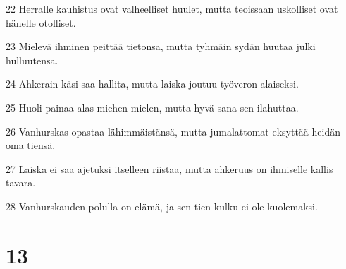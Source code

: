 \par 22 Herralle kauhistus ovat valheelliset huulet, mutta teoissaan uskolliset ovat hänelle otolliset.
\par 23 Mielevä ihminen peittää tietonsa, mutta tyhmäin sydän huutaa julki hulluutensa.
\par 24 Ahkerain käsi saa hallita, mutta laiska joutuu työveron alaiseksi.
\par 25 Huoli painaa alas miehen mielen, mutta hyvä sana sen ilahuttaa.
\par 26 Vanhurskas opastaa lähimmäistänsä, mutta jumalattomat eksyttää heidän oma tiensä.
\par 27 Laiska ei saa ajetuksi itselleen riistaa, mutta ahkeruus on ihmiselle kallis tavara.
\par 28 Vanhurskauden polulla on elämä, ja sen tien kulku ei ole kuolemaksi.

\chapter{13}

